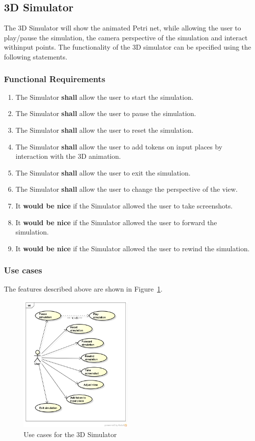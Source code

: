 \subsection{3D Simulator}
\label{sec:sf-simulator}

The 3D Simulator will show the animated Petri net, while allowing the user to play/pause the simulation, the camera perspective of the simulation and interact withinput points. The functionality of the 3D simulator can be specified using the following statements.

\subsubsection{Functional Requirements}
\begin{enumerate}
\item The Simulator \textbf{shall} allow the user to start the simulation.
\item The Simulator \textbf{shall} allow the user to pause the simulation.
\item The Simulator \textbf{shall} allow the user to reset the simulation.
\item The Simulator \textbf{shall} allow the user to add tokens on input places by interaction with the 3D animation.
\item The Simulator \textbf{shall} allow the user to exit the simulation.
\item The Simulator \textbf{shall} allow the user to change the perspective of the view.
\item It \textbf{would be nice} if the Simulator allowed the user to take screenshots.
\item It \textbf{would be nice} if the Simulator allowed the user to forward the simulation.
\item It \textbf{would be nice} if the Simulator allowed the user to rewind the simulation.
\end{enumerate}

\subsubsection{Use cases}

The features described above are shown in Figure~\ref{fig:use-cases-simulator}.

\begin{figure}[htp]
\begin{center}
  \includegraphics[width=0.5\textwidth]{image/uc-simulator.png}
  \caption{Use cases for the 3D Simulator}
  \label{fig:use-cases-simulator}
\end{center}
\end{figure}